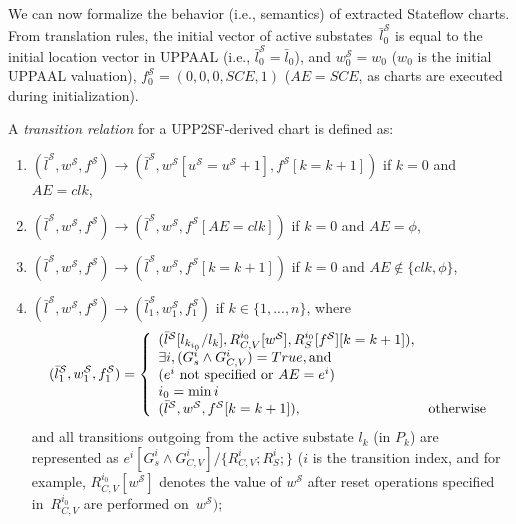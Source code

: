 We can now formalize the behavior (i.e., semantics) of extracted Stateflow charts. From translation rules, the initial vector of active substates~$\bar{l}^\mathcal{S}_0$ is equal to the initial location vector in UPPAAL (i.e., $\bar{l}^\mathcal{S}_0=\bar{l}_0$), and $w^\mathcal{S}_0=w_0$ ($w_0$ is the initial UPPAAL valuation), $f^\mathcal{S}_0=(0,0,0,SCE,1)$ ($AE=SCE$, as charts are executed during initialization). 

\begin{definition}
\label{def:sf_sem}
A \textit{transition relation} for a UPP2SF-derived chart is defined as:

\begin{enumerate}
\item $(\bar{l}^\mathcal{S},w^\mathcal{S},f^\mathcal{S})\rightarrow (\bar{l}^\mathcal{S},w^\mathcal{S}[u^\mathcal{S}=u^\mathcal{S}+1],f^\mathcal{S}[k=k+1])$ if $k=0$ and $AE=clk$,

\item  $(\bar{l}^\mathcal{S},w^\mathcal{S},f^\mathcal{S})\rightarrow (\bar{l}^\mathcal{S},w^\mathcal{S},f^\mathcal{S}[AE=clk])$ if $k=0$ and $AE=\phi$,

\item $(\bar{l}^\mathcal{S},w^\mathcal{S},f^\mathcal{S})\rightarrow (\bar{l}^\mathcal{S},w^\mathcal{S},f^\mathcal{S}[k=k+1])$ if $k=0$ and $AE\notin\{clk,\phi\}$,

\item $(\bar{l}^\mathcal{S},w^\mathcal{S},f^\mathcal{S})\rightarrow (\bar{l}^\mathcal{S}_1,w^\mathcal{S}_1,f^\mathcal{S}_1)$ if $k\in\{1,...,n\}$, where
\begin{equation*}
(\bar{l}^\mathcal{S}_1, w^\mathcal{S}_1,f^\mathcal{S}_1)= \left\{
\begin{array}{lr} 
(\bar{l}^\mathcal{S}[l_{k_{i_0}}/l_k], R_{C,V}^{i_0}[w^\mathcal{S}],R_S^{i_0}[f^\mathcal{S}][k=k+1]), \\ \exists i, (G_s^i\wedge G_{C,V}^i)=True, \hbox{and }\\
 (e^i\hbox{ not specified or } AE=e^i)\\
 i_0=\min i\\
(\bar{l}^\mathcal{S}, w^\mathcal{S},f^\mathcal{S}[k=k+1]), & \hbox{otherwise}
\end{array}
\right.
\end{equation*}
and all transitions outgoing from the active substate $l_k$ (in $P_k$) are represented as 
$e^i[G_s^i\wedge G_{C,V}^i]/\{R_{C,V}^i; R_S^i;\}$ ($i$ is the transition index, and for example, $R_{C,V}^{i_0}[w^\mathcal{S}]$ denotes the value of $w^\mathcal{S}$ after reset operations specified in~$R_{C,V}^{i_0}$ are performed on~$w^\mathcal{S})$;


\end{enumerate}
\end{definition}
